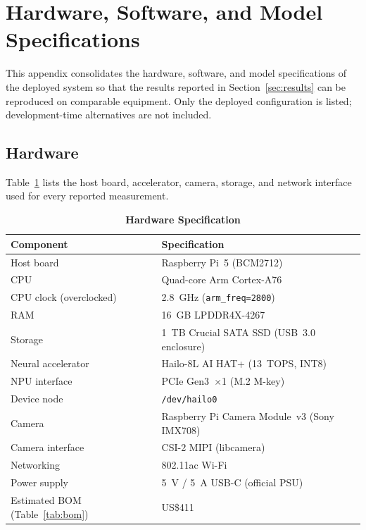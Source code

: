 \documentclass{ieeeaccess}
\begin{document}
\appendices
\section{Hardware, Software, and Model Specifications}
\label{sec:specs}
This appendix consolidates the hardware, software, and model specifications of the deployed system so that the results reported in Section~\ref{sec:results} can be reproduced on comparable equipment. Only the deployed configuration is listed; development-time alternatives are not included.

\subsection{Hardware}
Table~\ref{tab:hw_specs} lists the host board, accelerator, camera, storage, and network interface used for every reported measurement.

\begin{table}[ht!]
\caption{\textbf{Hardware Specification}}
\label{tab:hw_specs}
\setlength{\tabcolsep}{3pt}
\centering\footnotesize
\begin{tabular}{|l|p{4.0cm}|}
\hline
\textbf{Component} & \textbf{Specification} \\
\hline
Host board & Raspberry Pi~5 (BCM2712) \\
CPU & Quad-core Arm Cortex-A76 \\
CPU clock (overclocked) & 2.8~GHz (\texttt{arm\_freq=2800}) \\
RAM & 16~GB LPDDR4X-4267 \\
Storage & 1~TB Crucial SATA SSD (USB~3.0 enclosure) \\
Neural accelerator & Hailo-8L AI HAT+ (13~TOPS, INT8) \\
NPU interface & PCIe Gen3~$\times$1 (M.2 M-key) \\
Device node & \texttt{/dev/hailo0} \\
Camera & Raspberry Pi Camera Module~v3 (Sony IMX708) \\
Camera interface & CSI-2 MIPI (libcamera) \\
Networking & 802.11ac Wi-Fi \\
Power supply & 5~V / 5~A USB-C (official PSU) \\
Estimated BOM (Table~\ref{tab:bom}) & US\$411 \\
\hline
\end{tabular}
\end{table}
\end{document}
